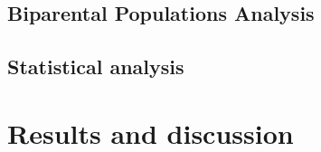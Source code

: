 \documentclass[9pt,twocolumn,twoside,lineno]{gsajnl}
\begin{document}
\subsection*{Biparental Populations Analysis}




\subsection{Statistical analysis}


\section{Results and discussion}

\end{document}
